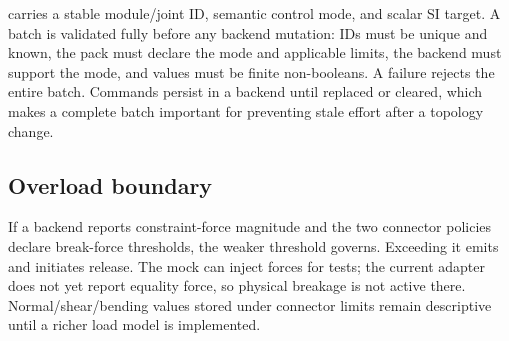  carries a stable module/joint ID, semantic control mode, and scalar
SI target. A batch is validated fully before any backend mutation: IDs must be unique
and known, the pack must declare the mode and applicable limits, the backend must
support the mode, and values must be finite non-booleans. A failure rejects the entire
batch. Commands persist in a backend until replaced or cleared, which makes a complete
batch important for preventing stale effort after a topology change.

\subsection{Overload boundary}

If a backend reports constraint-force magnitude and the two connector policies declare
break-force thresholds, the weaker threshold governs. Exceeding it emits
 and initiates release. The mock can inject forces for tests;
the current \mujoco{} adapter does not yet report equality force, so physical breakage
is not active there. Normal/shear/bending values stored under connector limits remain
descriptive until a richer load model is implemented.

